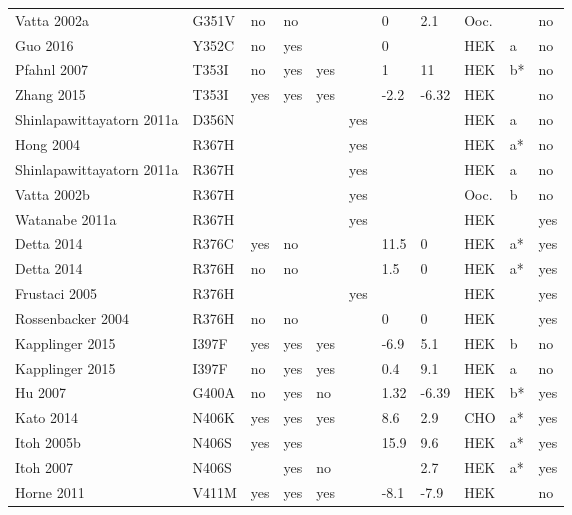 \begin{tiny}
\begin{longtable}{p{4cm}|l|llll|ll|lll}
Vatta 2002a\cite{Vatta2002aMutationDB} & G351V & no & no &  &  & 0 & 2.1 & Ooc. &  & no \\
Guo 2016\cite{Guo2016MutationDB} & Y352C & no & yes &  &  & 0 &  & HEK & a & no \\
Pfahnl 2007\cite{Pfahnl2007MutationDB} & T353I & no & yes & yes &  & 1 & 11 & HEK & b* & no \\
Zhang 2015\cite{Zhang2015MutationDB} & T353I & yes & yes & yes &  & -2.2 & -6.32 & HEK &  & no \\
Shinlapawittayatorn 2011a\cite{Shinlapawittayatorn2011aMutationDB} & D356N &  &  &  & yes &  &  & HEK & a & no \\
Hong 2004\cite{Hong2004MutationDB} & R367H &  &  &  & yes &  &  & HEK & a* & no \\
Shinlapawittayatorn 2011a\cite{Shinlapawittayatorn2011aMutationDB} & R367H &  &  &  & yes &  &  & HEK & a & no \\
Vatta 2002b\cite{Vatta2002bMutationDB} & R367H &  &  &  & yes &  &  & Ooc. & b & no \\
Watanabe 2011a\cite{Watanabe2011aMutationDB} & R367H &  &  &  & yes &  &  & HEK &  & yes \\
Detta 2014\cite{Detta2014MutationDB} & R376C & yes & no &  &  & 11.5 & 0 & HEK & a* & yes \\
Detta 2014\cite{Detta2014MutationDB} & R376H & no & no &  &  & 1.5 & 0 & HEK & a* & yes \\
Frustaci 2005\cite{Frustaci2005MutationDB} & R376H &  &  &  & yes &  &  & HEK &  & yes \\
Rossenbacker 2004\cite{Rossenbacker2004MutationDB} & R376H & no & no &  &  & 0 & 0 & HEK &  & yes \\
Kapplinger 2015\cite{Kapplinger2015MutationDB} & I397F & yes & yes & yes &  & -6.9 & 5.1 & HEK & b & no \\
Kapplinger 2015\cite{Kapplinger2015MutationDB} & I397F & no & yes & yes &  & 0.4 & 9.1 & HEK & a & no \\
Hu 2007\cite{Hu2007MutationDB} & G400A & no & yes & no &  & 1.32 & -6.39 & HEK & b* & yes \\
Kato 2014\cite{Kato2014MutationDB} & N406K & yes & yes & yes &  & 8.6 & 2.9 & CHO & a* & yes \\
Itoh 2005b\cite{Itoh2005bMutationDB} & N406S & yes & yes &  &  & 15.9 & 9.6 & HEK & a* & yes \\
Itoh 2007\cite{Itoh2007MutationDB} & N406S &  & yes & no &  &  & 2.7 & HEK & a* & yes \\
Horne 2011\cite{Horne2011MutationDB} & V411M & yes & yes & yes &  & -8.1 & -7.9 & HEK &  & no \\

\end{longtable}
\end{tiny}
